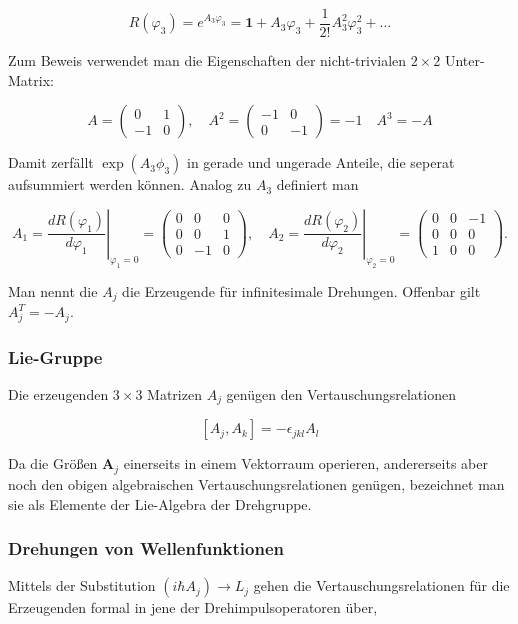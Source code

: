 \documentclass[10pt, letterpaper]{article}
\begin{document}
$$
R\left(\varphi_{3}\right)=e^{A_{3} \varphi_{3}}=\mathbf{1}+A_{3} \varphi_{3}+\frac{1}{2!} A_{3}^{2} \varphi_{3}^{2}+\ldots
$$

Zum Beweis verwendet man die Eigenschaften der nicht-trivialen $2 \times 2$ Unter-Matrix:

$$
A=\left(\begin{array}{cc}
0 & 1 \\
-1 & 0
\end{array}\right), \quad A^{2}=\left(\begin{array}{cc}
-1 & 0 \\
0 & -1
\end{array}\right)=-1 \quad A^{3}=-A
$$

Damit zerfällt $\exp \left(A_{3} \phi_{3}\right)$ in gerade und ungerade Anteile, die seperat aufsummiert werden können. Analog zu $A_{3}$ definiert man

$$
A_{1}=\left.\frac{d R\left(\varphi_{1}\right)}{d \varphi_{1}}\right|_{\varphi_{1}=0}=\left(\begin{array}{ccc}
0 & 0 & 0 \\
0 & 0 & 1 \\
0 & -1 & 0
\end{array}\right), \quad A_{2}=\left.\frac{d R\left(\varphi_{2}\right)}{d \varphi_{2}}\right|_{\varphi_{2}=0}=\left(\begin{array}{ccc}
0 & 0 & -1 \\
0 & 0 & 0 \\
1 & 0 & 0
\end{array}\right) .
$$

Man nennt die $A_{j}$ die Erzeugende für infinitesimale Drehungen. Offenbar gilt $A_{j}^{T}=-A_{j}$.

\subsubsection*{Lie-Gruppe}
Die erzeugenden $3 \times 3$ Matrizen $A_{j}$ genügen den Vertauschungsrelationen

$$
\left[A_{j}, A_{k}\right]=-\epsilon_{j k l} A_{l}
$$

Da die Größen $\mathbf{A}_{j}$ einerseits in einem Vektorraum operieren, andererseits aber noch den obigen algebraischen Vertauschungsrelationen genügen, bezeichnet man sie als Elemente der Lie-Algebra der Drehgruppe.

\subsubsection*{Drehungen von Wellenfunktionen}
Mittels der Substitution $\left(i \hbar A_{j}\right) \rightarrow L_{j}$ gehen die Vertauschungsrelationen für die Erzeugenden formal in jene der Drehimpulsoperatoren über,
\end{document}
